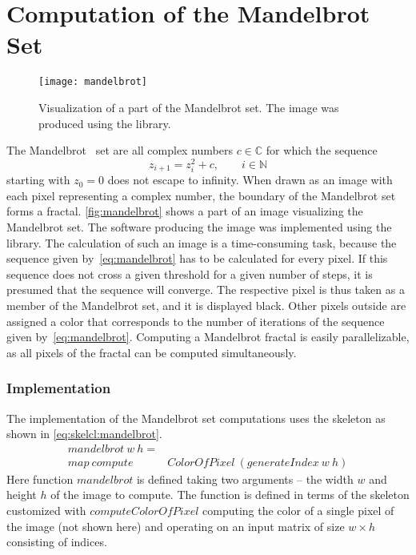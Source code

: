 \section{Computation of the Mandelbrot Set}

\begin{figure}[tb]
  \centering
  \texttt{[image: mandelbrot]}
  \caption{Visualization of a part of the Mandelbrot set. The image was produced using the \SkelCL library.}
  \label{fig:mandelbrot}
\end{figure}

The Mandelbrot~\cite{Mandelbrot1980} set are all complex numbers $c \in {\mathbb C}$ for which the sequence
\begin{equation}
	z_{i+1} = z_{i}^{2} + c,\qquad i\in {\mathbb N}
	\label{eq:mandelbrot}
\end{equation}
starting with $z_{0}=0$ does not escape to infinity.
When drawn as an image with each pixel representing a complex number, the boundary of the Mandelbrot set forms a fractal.
\autoref{fig:mandelbrot} shows a part of an image visualizing the Mandelbrot set.
The software producing the image was implemented using the \SkelCL library. 
The calculation of such an image is a time-consuming task, because the sequence given by~\autoref{eq:mandelbrot} has to be calculated for every pixel.
If this sequence does not cross a given threshold for a given number of steps, it is presumed that the sequence will converge.
The respective pixel is thus taken as a member of the Mandelbrot set, and it is displayed black.
Other pixels outside are assigned a color that corresponds to the number of iterations of the sequence given by~\autoref{eq:mandelbrot}.
Computing a Mandelbrot fractal is easily parallelizable, as all pixels of the fractal can be computed simultaneously.

\subsubsection*{\SkelCL Implementation}
\label{sec:mandelbrot:implementation}
The \SkelCL implementation of the Mandelbrot set computations uses the \map skeleton as shown in \autoref{eq:skelcl:mandelbrot}.
\begin{align}
  mandelbrot\ w\ h =&  \nonumber\\
         map\ compute&ColorOfPixel\ (generateIndex\ w\ h)
  \label{eq:skelcl:mandelbrot}
\end{align}
Here function $mandelbrot$ is defined taking two arguments -- the width $w$ and height $h$ of the image to compute.
The function is defined in terms of the \map skeleton customized with $computeColorOfPixel$ computing the color of a single pixel of the image (not shown here) and operating on an input matrix of size $w\times h$ consisting of indices.

